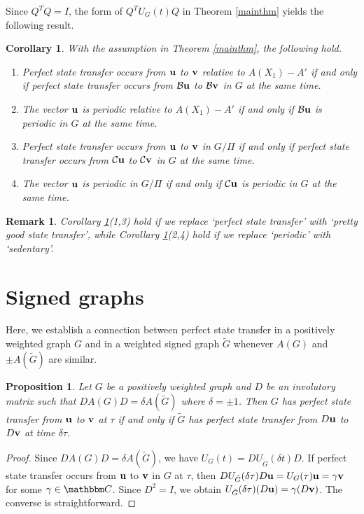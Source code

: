 \documentclass[12pt,a4paper]{article}
\newtheorem{prop}{Proposition}
\newtheorem{cor}{Corollary}
\newtheorem{rem}{Remark}
\def \Cl {{\mathbbm C}}
\def \u {{\bf u}}
\def \v {{\bf v}}
\begin{document}
Since $Q^TQ=I$, the form of $Q^TU_G(t)Q$ in Theorem \ref{mainthm} yields the following result.

\begin{cor}
\label{maincor}
With the assumption in Theorem \ref{mainthm}, the following hold.
\begin{enumerate}
\item Perfect state transfer occurs from $\u$ to $\v$ relative to $A(X_1)-A'$ if and only if perfect state transfer occurs from $\mathcal{B}\u$ to $\mathcal{B}\v$ in $G$ at the same time.
\item The vector $\u$ is periodic relative to $A(X_1)-A'$ if and only if $\mathcal{B}\u$ is periodic in $G$ at the same time.
\item Perfect state transfer occurs from $\u$ to $\v$ in $G/\Pi$ if and only if perfect state transfer occurs from $\mathcal{C}\u$ to $\mathcal{C}\v$ in $G$ at the same time.
\item The vector $\u$ is periodic in $G/\Pi$ if and only if $\mathcal{C}\u$ is periodic in $G$ at the same time.
\end{enumerate}
\end{cor}

\begin{rem}
Corollary \ref{maincor}(1,3) hold if we replace `perfect state transfer' with `pretty good state transfer', while Corollary \ref{maincor}(2,4) hold if we replace `periodic' with `sedentary'. 
\end{rem}

\section{Signed graphs}\label{sec:sgned}

Here, we establish a connection between perfect state transfer in a positively weighted graph $G$ and in a weighted signed graph $\tilde{G}$ whenever $A(G)$ and $\pm A(\tilde{G})$ are similar.

\begin{prop}
\label{prop}
Let $G$ be a positively weighted graph and $D$ be an involutory matrix such that $DA(G)D=\delta A(\tilde{G})$ where $\delta=\pm 1$. Then $G$ has perfect state transfer from $\u$ to $\v$ at $\tau$ if and only if $\tilde{G}$ has perfect state transfer from $D\u$ to $D\v$ at time $\delta\tau$.
\end{prop}

\begin{proof}
Since $DA(G)D=\delta A(\tilde{G})$, we have $U_{G}(t)=DU_{\tilde{G}}(\delta t)D$. If perfect state transfer occurs from $\u$ to $\v$ in $G$ at $\tau$, then $DU_{\tilde{G}}(\delta \tau)D\u=U_{G}(\tau)\u=\gamma\v$ for some $\gamma\in\Cl$. Since $D^2=I$, we obtain $U_{\tilde{G}}(\delta\tau)(D\u)=\gamma(D\v)$. The converse is straightforward.
\end{proof}
\end{document}
